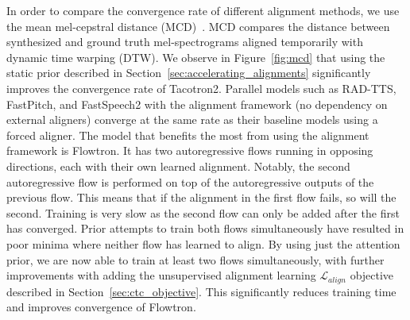 In order to compare the convergence rate of different alignment methods, we use the mean mel-cepstral distance (MCD)~\cite{mcd, Battenberg}. MCD compares the distance between synthesized and ground truth mel-spectrograms aligned temporarily with dynamic time warping (DTW). We observe in Figure~\ref{fig:mcd} that using the static prior described in Section~\ref{sec:accelerating_alignments} significantly improves the convergence rate of Tacotron2. Parallel models such as RAD-TTS, FastPitch, and FastSpeech2 with the alignment framework (no dependency on external aligners) converge at the same rate as their baseline models using a forced aligner. The model that benefits the most from using the alignment framework is Flowtron. It has two autoregressive flows running in opposing directions, each with their own learned alignment. Notably, the second autoregressive flow is performed on top of the autoregressive outputs of the previous flow. This means that if the alignment in the first flow fails, so will the second. Training is very slow as the second flow can only be added after the first has converged. Prior attempts to train both flows simultaneously have resulted in poor minima where neither flow has learned to align. By using just the attention prior, we are now able to train at least two flows simultaneously, with further improvements with adding the unsupervised alignment learning $\mathcal{L}_{\mathit{align}}$ objective described in Section~\ref{sec:ctc_objective}. This significantly reduces training time and improves convergence of Flowtron. 



